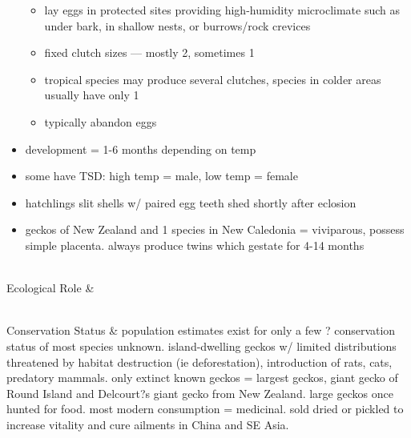 \begin{center}
\begin{longtabu}
\begin{itemize}[noitemsep]
			\begin{itemize}[noitemsep]
				\item lay eggs in protected sites providing high-humidity microclimate such as under bark, in shallow nests, or burrows/rock crevices
				\item fixed clutch sizes --- mostly 2, sometimes 1
				\item tropical species may produce several clutches, species in colder areas usually have only 1
				\item typically abandon eggs
			\end{itemize}
		\item development = 1-6 months depending on temp
		\item some have TSD: high temp = male, low temp = female
		\item hatchlings slit shells w/ paired egg teeth shed shortly after eclosion
		\item geckos of New Zealand and 1 species in New Caledonia = viviparous, possess simple placenta. always produce twins which gestate for 4-14 months
	\end{itemize}
	\\
	\hline
	Ecological Role &
	
	\\
	\hline
	Conservation Status & 
	population estimates exist for only a few ? conservation status of most species unknown. island-dwelling geckos w/ limited distributions threatened by habitat destruction (ie deforestation), introduction of rats, cats, predatory mammals. only extinct known geckos = largest geckos, giant gecko of Round Island and Delcourt?s giant gecko from New Zealand. large geckos once hunted for food. most modern consumption = medicinal. sold dried or pickled to increase vitality and cure ailments in China and SE Asia.
	\\
	\hline
\end{longtabu}
\end{center}